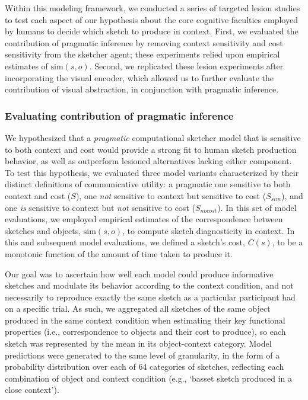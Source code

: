 \documentclass[9pt,twocolumn,twoside]{pnas-new}
\begin{document}
Within this modeling framework, we conducted a series of targeted lesion studies to test each aspect of our hypothesis about the core cognitive faculties employed by humans to decide which sketch to produce in context. 
First, we evaluated the contribution of pragmatic inference by removing context sensitivity and cost sensitivity from the sketcher agent; these experiments relied upon empirical estimates of $\textrm{sim}(s,o)$. 
Second, we replicated these lesion experiments after incorporating the visual encoder, which allowed us to further evaluate the contribution of visual abstraction, in conjunction with pragmatic inference.

\subsubsection*{Evaluating contribution of pragmatic inference}


We hypothesized that a \textit{pragmatic} computational sketcher model that is sensitive to both context and cost would provide a strong fit to human sketch production behavior, as well as outperform lesioned alternatives lacking either component.
To test this hypothesis, we evaluated three model variants characterized by their distinct definitions of communicative utility: a pragmatic one sensitive to both context and cost ($S$), one \textit{not} sensitive to context but sensitive to cost ($S_{sim}$), and one \textit{is} sensitive to context but \textit{not} sensitive to cost ($S_{nocost}$).
In this set of model evaluations, we employed empirical estimates of the correspondence between sketches and objects, $\textrm{sim}(s,o)$, to compute sketch diagnosticity in context. 
In this and subsequent model evaluations, we defined a sketch's cost, $C(s)$, to be a monotonic function of the amount of time taken to produce it.

Our goal was to ascertain how well each model could produce informative sketches and modulate its behavior according to the context condition, and not necessarily to reproduce exactly the same sketch as a particular participant had on a specific trial. 
As such, we aggregated all sketches of the same object produced in the same context condition when estimating their key functional properties (i.e., correspondence to objects and their cost to produce), so each sketch was represented by the mean in its object-context category. 
Model predictions were generated to the same level of granularity, in the form of a probability distribution over each of 64 categories of sketches, reflecting each combination of object and context condition (e.g., `basset sketch produced in a close context'). 
\end{document}
